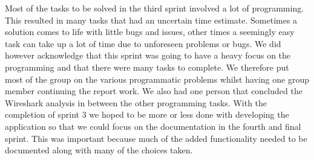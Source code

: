 Most of the tasks to be solved in the third sprint involved a lot of programming. This resulted in many tasks that had an uncertain time estimate. Sometimes a solution comes to life with little bugs and issues, other times a seemingly easy task can take up a lot of time due to unforeseen problems or bugs. We did however acknowledge that this sprint was going to have a heavy focus on the programming and that there were many tasks to complete. We therefore put most of the group on the various programmatic problems whilst having one group member continuing the report work. We also had one person that concluded the Wireshark analysis in between the other programming tasks. 
\newline
\newline
With the completion of sprint 3 we hoped to be more or less done with developing the application so that we could focus on the documentation in the fourth and final sprint. This was important because much of the added functionality needed to be documented along with many of the choices taken.